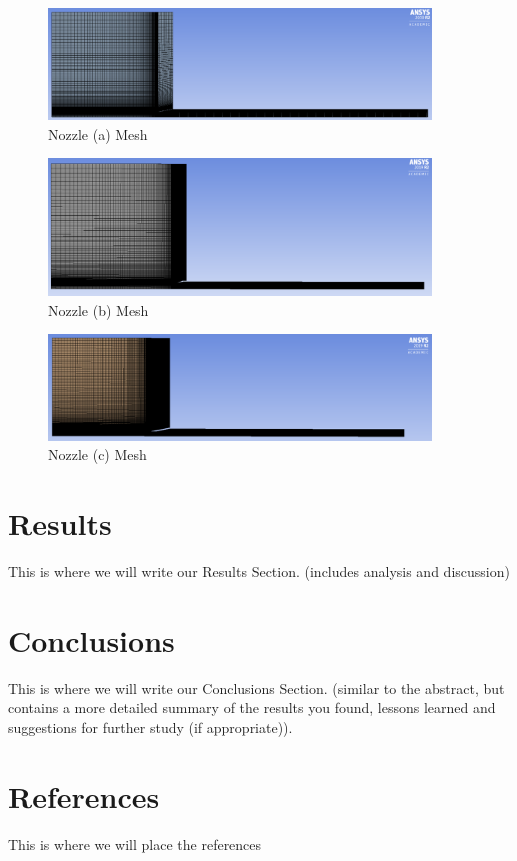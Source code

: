 \documentclass[12pt]{article} %
\begin{document}
\begin{figure}
    \centering
    \includegraphics[width = 4in]{NozzleA_Mesh.PNG}
    \caption{Nozzle (a) Mesh}
    \label{fig:geomA}
\end{figure}

\begin{figure}
    \centering
    \includegraphics[width = 4in]{NozzleB_Mesh.PNG}
    \caption{Nozzle (b) Mesh}
    \label{fig:geomB}
\end{figure}

\begin{figure}
    \centering
    \includegraphics[width = 4in]{NozzleC_Mesh.PNG}
    \caption{Nozzle (c) Mesh}
    \label{fig:geomC}
\end{figure}


\section{Results}
This is where we will write our Results Section.  (includes analysis and discussion)

\section{Conclusions}
This is where we will write our Conclusions Section.  (similar to the abstract, but contains a more detailed summary
of the results you found, lessons learned and suggestions for further study (if
appropriate)).

\section{References}
This is where we will place the references
\nocite{*}
\begingroup
\renewcommand{\section}[2]{}%


\endgroup
\end{document}
